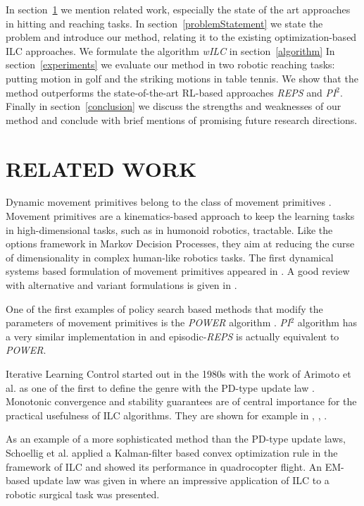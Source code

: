 In section~\ref{relatedWork} we mention related work, especially the state of the art approaches in hitting and reaching tasks. In section~\ref{problemStatement} we state the problem and introduce our method, relating it to the existing optimization-based ILC approaches. We formulate the algorithm \emph{wILC} in section~\ref{algorithm} In section~\ref{experiments} we evaluate our method in two robotic reaching tasks: putting motion in golf and the striking motions in table tennis. We show that the method outperforms the state-of-the-art RL-based approaches \emph{REPS} and \emph{PI$^{2}$}. Finally in section~\ref{conclusion} we discuss the strengths and weaknesses of our method and conclude with brief mentions of promising future research directions.

\section{RELATED WORK}\label{relatedWork}

Dynamic movement primitives belong to the class of movement primitives \cite{Flash85}. Movement primitives are a kinematics-based approach to keep the learning tasks in high-dimensional tasks, such as in humonoid robotics, tractable. Like the options framework in Markov Decision Processes, they aim at reducing the curse of dimensionality in complex human-like robotics tasks. The first dynamical systems based formulation of movement primitives appeared in \cite{Ijspeert02}. A good review with alternative and variant formulations is given in \cite{Ijspeert13}.

One of the first examples of policy search based methods that modify the parameters of movement primitives is the \emph{POWER} algorithm \cite{Kober08}. \emph{PI$^{2}$} algorithm has a very similar implementation in \cite{Theodorou10} and episodic-\emph{REPS} \cite{Peter10} is actually equivalent to \emph{POWER}.

Iterative Learning Control started out in the 1980s with the work of Arimoto et al. \cite{Arimoto84} as one of the first to define the genre with the PD-type update law \cite{Bristow06}. Monotonic convergence and stability guarantees are of central importance for the practical usefulness of ILC algorithms. They are shown for example in \cite{Bristow06}, \cite{Norrloef02}, \cite{Longman2000}.

As an example of a more sophisticated method than the PD-type update laws, Schoellig et al. \cite{Schoellig12} applied a Kalman-filter based convex optimization rule in the framework of ILC and showed its performance in quadrocopter flight. An EM-based update law was given in \cite{Berg10} where an impressive application of ILC to a robotic surgical task was presented.

